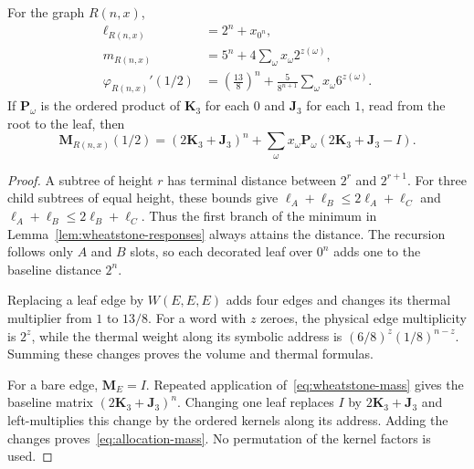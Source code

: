 \begin{lemma}\label{lem:allocation-formulas}
For the graph $R(n,x)$,
\begin{align}
 \ell_{R(n,x)}&=2^n+x_{0^n},\label{eq:allocation-length}\\
 m_{R(n,x)}&=5^n+4\sum_{\omega}x_\omega2^{z(\omega)},\label{eq:allocation-volume}\\
 \varphi_{R(n,x)}'(1/2)
 &=\left(\frac{13}{8}\right)^n
   +\frac5{8^{n+1}}\sum_{\omega}x_\omega6^{z(\omega)}.\label{eq:allocation-thermal}
\end{align}
If $\mathbf P_\omega$ is the ordered product of $\mathbf K_3$ for each $0$ and $\mathbf J_3$ for each $1$, read from the root to the leaf, then
\begin{equation}\label{eq:allocation-mass}
 \mathbf M_{R(n,x)}(1/2)
 =(2\mathbf K_3+\mathbf J_3)^n+
 \sum_\omega x_\omega\mathbf P_\omega
 (2\mathbf K_3+\mathbf J_3-I).
\end{equation}
\end{lemma}
\begin{proof}
A subtree of height $r$ has terminal distance between $2^r$ and $2^{r+1}$. For three child subtrees of equal height, these bounds give $\ell_A+\ell_B\le2\ell_A+\ell_C$ and $\ell_A+\ell_B\le2\ell_B+\ell_C$. Thus the first branch of the minimum in Lemma~\ref{lem:wheatstone-responses} always attains the distance. The recursion follows only $A$ and $B$ slots, so each decorated leaf over $0^n$ adds one to the baseline distance $2^n$.

Replacing a leaf edge by $W(E,E,E)$ adds four edges and changes its thermal multiplier from $1$ to $13/8$. For a word with $z$ zeroes, the physical edge multiplicity is $2^z$, while the thermal weight along its symbolic address is $(6/8)^z(1/8)^{n-z}$. Summing these changes proves the volume and thermal formulas.

For a bare edge, $\mathbf M_E=I$. Repeated application of~\eqref{eq:wheatstone-mass} gives the baseline matrix $(2\mathbf K_3+\mathbf J_3)^n$. Changing one leaf replaces $I$ by $2\mathbf K_3+\mathbf J_3$ and left-multiplies this change by the ordered kernels along its address. Adding the changes proves~\eqref{eq:allocation-mass}. No permutation of the kernel factors is used.
\end{proof}

